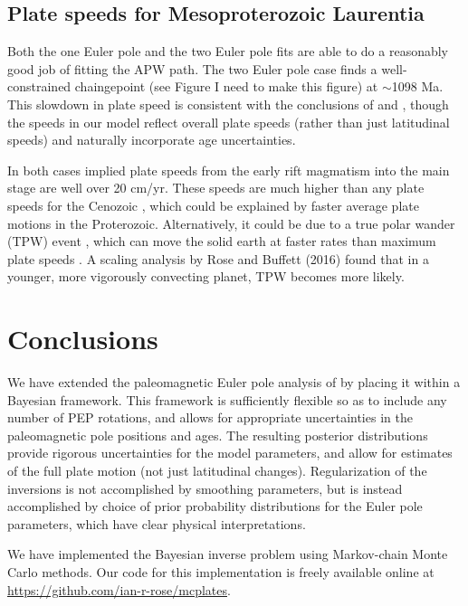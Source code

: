 \documentclass[preprint,12pt,authoryear]{elsarticle}
\begin{document}
\subsection{Plate speeds for Mesoproterozoic Laurentia}
\label{sec:laurentian_plate_speeds}
Both the one Euler pole and the two Euler pole fits are able to do a reasonably good job of fitting the APW path.
The two Euler pole case finds a well-constrained chaingepoint (see Figure I need to make this figure) at $\sim$1098 Ma.
This slowdown in plate speed is consistent with the conclusions of \citet{davis1997geochronology} 
and \citet{swanson2009no}, though the speeds in our model reflect overall plate speeds 
(rather than just latitudinal speeds) and naturally incorporate age uncertainties.

In both cases implied plate speeds from the early rift magmatism into the main stage are well over 20 cm/yr.
These speeds are much higher than any plate speeds for the Cenozoic \citep{zahirovic2015tectonic},
which could be explained by faster average plate motions in the Proterozoic.
Alternatively, it could be due to a true polar wander (TPW) event \citep{evans2003true, swanson2009no},
which can move the solid earth at faster rates than maximum plate speeds \citep{cambiotti2011new}.
A scaling analysis by Rose and Buffett (2016) found that in a younger, more vigorously convecting
planet, TPW becomes more likely.

\section{Conclusions}
\label{sec:conclusions}

We have extended the paleomagnetic Euler pole analysis of 
\citet{gordon1984paleomagnetic} by placing it within a Bayesian framework. 
This framework is sufficiently flexible so as to include any number of PEP rotations,
and allows for appropriate uncertainties in the paleomagnetic pole positions and ages.
The resulting posterior distributions provide rigorous uncertainties for the model parameters,
and allow for estimates of the full plate motion (not just latitudinal changes).
Regularization of the inversions is not accomplished by smoothing parameters,
but is instead accomplished by choice of prior probability distributions for the Euler pole parameters,
which have clear physical interpretations.

We have implemented the Bayesian inverse problem using Markov-chain
Monte Carlo methods. Our code for this implementation is freely available online at
\url{https://github.com/ian-r-rose/mcplates}.
\end{document}
